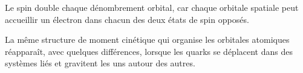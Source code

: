 Le spin double chaque dénombrement orbital, car chaque orbitale spatiale peut accueillir un électron dans chacun des deux états de spin opposés.

\begin{classroomqa}
\end{classroomqa}

La même structure de moment cinétique qui organise les orbitales atomiques réapparaît, avec quelques différences, lorsque les quarks se déplacent dans des systèmes liés et gravitent les uns autour des autres.
